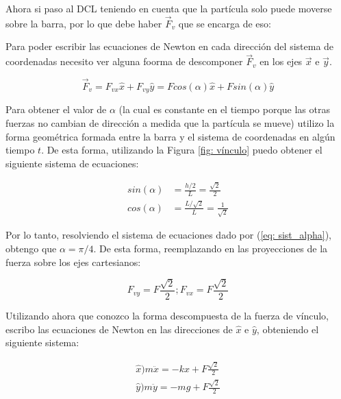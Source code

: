 \documentclass{article}
\begin{document}
Ahora si paso al DCL teniendo en cuenta que la partícula solo puede moverse sobre la barra, por lo que debe haber $\vec{F}_{v}$ que se encarga de eso:

\begin{figure}
    \label{fig: DCL}
\end{figure}

Para poder escribir las ecuaciones de Newton en cada dirección del sistema de coordenadas necesito ver alguna foorma de descomponer $\vec{F}_v$ en los ejes $\vec{x}$ e $\vec{y}$.

\begin{equation}
    \vec{F}_v = F_{vx} \hat{x} + F_{vy} \hat{y} = Fcos(\alpha) \hat{x} + Fsin(\alpha) \hat{y}
\end{equation}

Para obtener el valor de $\alpha$ (la cual es constante en el tiempo porque las otras fuerzas no cambian de dirección a medida que la partícula se mueve) utilizo la forma geométrica formada entre la barra y el sistema de coordenadas en algún tiempo $t$. De esta forma, utilizando la Figura \ref{fig: vínculo} puedo obtener el siguiente sistema de ecuaciones:

\begin{equation}
\begin{split}
    sin(\alpha) &= \frac{h/2}{L} = \frac{\sqrt{2}}{2} \\
    cos(\alpha) &= \frac{L/\sqrt{2}}{L} = \frac{1}{\sqrt{2}}
    \label{eq: sist_alpha}
\end{split}
\end{equation}

Por lo tanto, resolviendo el sistema de ecuaciones dado por (\ref{eq: sist_alpha}), obtengo que $\alpha = \pi/4$. De esta forma, reemplazando en las proyecciones de la fuerza sobre los ejes cartesianos:

\begin{equation}
    F_{vy} = F \frac{\sqrt{2}}{2}; F_{vx} = F \frac{\sqrt{2}}{2}
\end{equation}

Utilizando ahora que conozco la forma descompuesta de la fuerza de vínculo, escribo las ecuaciones de Newton en las direcciones de $\hat{x}$ e $\hat{y}$, obteniendo el siguiente sistema:

\begin{equation}
\begin{split}
    \hat{x}\big) m\ddot{x} = -kx + F\frac{\sqrt{2}}{2} \\
    \hat{y}\big) m\ddot{y} = -mg + F\frac{\sqrt{2}}{2}
\end{split}
\end{equation}
\end{document}
